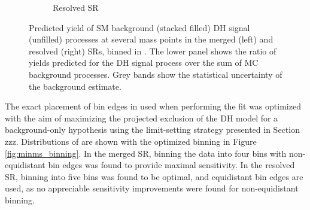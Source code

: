 \begin{figure}[htbp]
\begin{subfigure}[t]{0.48\textwidth}
     \caption{Resolved SR}
    \end{subfigure}
    \caption{Predicted yield of SM background (stacked filled) DH signal (unfilled) processes at several mass points in the merged (left) and resolved (right) SRs, binned in \minms. The lower panel shows the ratio of yields predicted for the DH signal process over the sum of MC background processes. Grey bands show the statistical uncertainty of the background estimate.}
   \label{fig:minms_shape_discrimination}
\end{figure}


The exact placement of bin edges in \minms used when performing the fit was optimized with the aim of maximizing the projected exclusion of the DH model for a background-only hypothesis using the limit-setting strategy presented in Section zzz. Distributions of \minms are shown with the optimized binning in Figure \ref{fig:minms_binning}. In the merged SR, binning the data into four \minms bins with non-equidistant bin edges was found to provide maximal sensitivity. In the resolved SR, binning into five \minms bins was found to be optimal, and equidistant bin edges are used, as no appreciable sensitivity improvements were found for non-equidistant binning.

